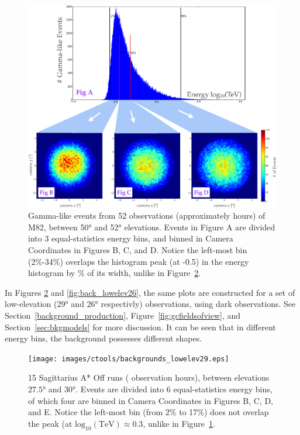     \begin{figure}[!ht]
      \centering
      \includegraphics[width=\textwidth]{images/ctools/backgrounds_highelev.eps}
      \caption[FITS Background at \ang{50} Elevation]{
        Gamma-like events from 52 observations (approximately  hours) of M82, between \ang{50} and \ang{52} elevations.
        Events in Figure A are divided into 3 equal-statistics energy bins, and binned in Camera Coordinates in Figures B, C, and D.
        Notice the left-most bin (2\%-34\%) overlaps the histogram peak (at -0.5) in the energy histogram by \% of its width, unlike in Figure~\ref{fig:back_lowelev29}.
      }
      \label{fig:back_highelev}
    \end{figure}

    In Figures \ref{fig:back_lowelev29} and \ref{fig:back_lowelev26}, the same plots are constructed for a set of low-elevation (\nicetilde{}\ang{29} and \nicetilde{}\ang{26} respectivly) observations, using dark observations.
    See Section~\ref{background_production}, Figure~\ref{fig:gcfieldsofview}, and Section~\ref{sec:bkgmodels} for more discussion.
    It can be seen that in different energy bins, the background possesses different shapes.

    \begin{figure}[!ht]
      \centering
      \texttt{[image: images/ctools/backgrounds\_lowelev29.eps]}
      \caption[CTOOLS Background at \ang{29} Elevation]{
        15 Sagittarius A* Off runs ( observation hours), between elevations $ \ang{27.5} $ and $ \ang{30} $.
        Events are divided into 6 equal-statistics energy bins, of which four are binned in Camera Coordinates in Figures B, C, D, and E.
        Notice the left-most bin (from 2\% to 17\%) does not overlap the peak (at $\textrm{log}_{10}\left ( \textrm{TeV} \right ) \approx 0.3$, unlike in Figure~\ref{fig:back_highelev}.
      }
      \label{fig:back_lowelev29}
    \end{figure}

